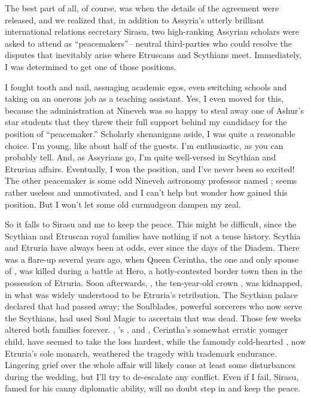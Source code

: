 \documentclass[char]{Kos}
\begin{document}
The best part of all, of course, was when the details of the agreement were released, and we realized that, in addition to Assyria's utterly brilliant international relations secretary Sirasu, two high-ranking Assyrian scholars were asked to attend as ``peacemakers''-- neutral third-parties who could resolve the disputes that inevitably arise where Etruscans and Scythians meet. Immediately, I was determined to get one of those positions.

I fought tooth and nail, assuaging academic egos, even switching schools and taking on an onerous job as a teaching assistant. Yes, I even moved for this, because the administration at Nineveh was so happy to steal away one of Ashur's star students that they threw their full support behind my candidacy for the position of ``peacemaker.'' Scholarly shenanigans aside, I was quite a reasonable choice. I'm young, like about half of the guests. I'm enthusiastic, as you can probably tell. And, as Assyrians go, I'm quite well-versed in Scythian and Etrurian affairs. Eventually, I won the position, and I've never been so excited! The other peacemaker is some odd Nineveh astronomy professor named \cAnarchist{}; \cAnarchist{\they} seems rather useless and unmotivated, and I can't help but wonder how \cAnarchist{\they} gained this position. But I won't let some old curmudgeon dampen my zeal.

So it falls to Sirasu and me to keep the peace. This might be difficult, since the Scythian and Etruscan royal families have nothing if not a tense history. Scythia and Etruria have always been at odds, ever since the days of the Diadem. There was a flare-up several years ago, when Queen Cerintha, the one and only spouse of \cEtruriaKing{}, was killed during a battle at Hero, a hotly-contested border town then in the possession of Etruria. Soon afterwards, \cFugitive{}, the ten-year-old crown \cFugitive{\prince}, was kidnapped, in what was widely understood to be Etruria's retribution. The Scythian palace declared that \cFugitive{} had passed away; the Soulblades, powerful sorcerers who now serve the Scythians, had used Soul Magic to ascertain that \cFugitive{\they} was dead. Those few weeks altered both families forever. \cScythiaQueen{}, \cFugitive{}'s \cScythiaQueen{\parent}, and \cPoet{}, Cerintha's somewhat erratic younger child, have seemed to take the loss hardest, while the famously cold-hearted \cEtruriaKing{}, now Etruria's sole monarch, weathered the tragedy with \cEtruriaKing{\their} trademark endurance. Lingering grief over the whole affair will likely cause at least some disturbances during the wedding, but I'll try to de-escalate any conflict. Even if I fail, Sirasu, famed for his canny diplomatic ability, will no doubt step in and keep the peace.
\end{document}
